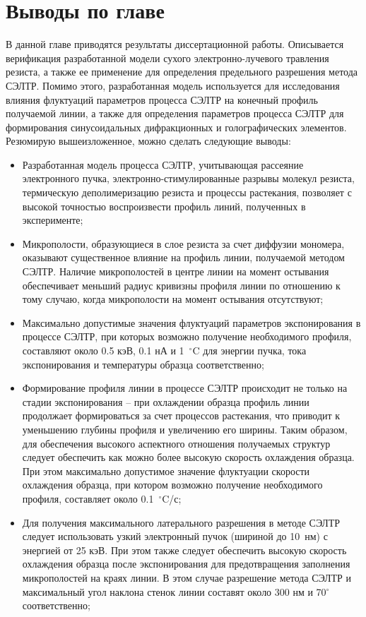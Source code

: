 \section{Выводы по главе}

В данной главе приводятся результаты  диссертационной работы.
Описывается верификация разработанной модели сухого электронно-лучевого травления резиста, а также ее применение для определения предельного разрешения метода СЭЛТР.
Помимо этого, разработанная модель используется для исследования влияния флуктуаций параметров процесса СЭЛТР на конечный профиль получаемой линии, а также для определения параметров процесса СЭЛТР для формирования синусоидальных дифракционных и голографических элементов.
Резюмирую вышеизложенное, можно сделать следующие выводы:

\begin{itemize}
	\item Разработанная модель процесса СЭЛТР, учитывающая рассеяние электронного пучка, электронно-стимулированные разрывы молекул резиста, термическую деполимеризацию резиста и процессы растекания, позволяет с высокой точностью воспроизвести профиль линий, полученных в эксперименте;
	\item Микрополости, образующиеся в слое резиста за счет диффузии мономера, оказывают существенное влияние на профиль линии, получаемой методом СЭЛТР. Наличие микрополостей в центре линии на момент остывания обеспечивает меньший радиус кривизны профиля линии по отношению к тому случаю, когда микрополости на момент остывания отсутствуют;
	\item Максимально допустимые значения флуктуаций параметров экспонирования в процессе СЭЛТР, при которых возможно получение необходимого профиля, составляют около 0.5 кэВ, 0.1 нА и 1~$^\circ$C для энергии пучка, тока экспонирования и температуры образца соответственно;
	\item Формирование профиля линии в процессе СЭЛТР происходит не только на стадии экспонирования -- при охлаждении образца профиль линии продолжает формироваться за счет процессов растекания, что приводит к уменьшению глубины профиля и увеличению его ширины. Таким образом, для обеспечения высокого аспектного отношения получаемых структур следует обеспечить как можно более высокую скорость охлаждения образца. При этом максимально допустимое значение флуктуации скорости охлаждения образца, при котором возможно получение необходимого профиля, составляет около 0.1~$^\circ$C/с;
	\item Для получения максимального латерального разрешения в методе СЭЛТР следует использовать узкий электронный пучок (шириной до 10~нм) с энергией от 25 кэВ. При этом также следует обеспечить высокую скорость охлаждения образца после экспонирования для предотвращения заполнения микрополостей на краях линии. В этом случае разрешение метода СЭЛТР и максимальный угол наклона стенок линии составят около 300 нм и 70$^\circ$ соответственно;

\end{itemize}
